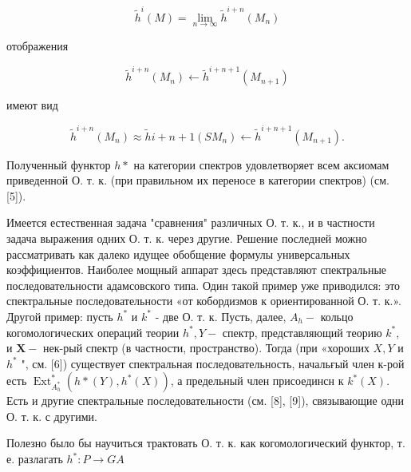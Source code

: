 \documentclass[10pt]{article}
\begin{document}
\[

\tilde{h}^{i}(M)=\lim _{n \rightarrow \infty} \tilde{h}^{i+n}\left(M_{n}\right)

\]



отображения



\[

\tilde{h}^{i+n}\left(M_{n}\right) \leftarrow \tilde{h}^{i+n+1}\left(M_{n+1}\right)

\]



имеют вид



\[

\tilde{h}^{i+n}\left(M_{n}\right) \approx \tilde{h} i+n+1\left(S M_{n}\right) \leftarrow \tilde{h}^{i+n+1}\left(M_{n+1}\right) .

\]



Полученный функтор $h *$ на категории спектров удовлетворяет всем аксиомам приведенной О. т. к. (при правильном их переносе в категории спектров) (см. [5]).



Имеется естественная задача "сравнения" различных О. т. к., и в частности задача выражения одних О. т. к. через другие. Решение последней можно рассматривать как далеко идущее обобщение формулы универсальных коэффициентов. Наиболее мощный аппарат здесь представляют спектральные последовательности адамсовского типа. Один такой пример уже приводился: это спектральные последовательности «от кобордизмов к ориентированной О. т. к.». Другой пример: пусть $h^{*}$ и $k^{*}$ - две О. т. к. Пусть, далее, $A_{h}-$ кольцо когомологических операций теории $h^{*}, Y-$ спектр, представляющий теорию $k^{*}$, и $\boldsymbol{X}-$ нек-рый спектр (в частности, пространство). Тогда (при «хороших $X, Y$ и $h^{*}$ ", см. [6]) существует спектральная последовательность, начальғый член к-рой есть $\operatorname{Ext}_{A_{h}^{*}}^{*}\left(h *(Y), h^{*}(X)\right)$, а предельный член присоединсн к $k^{*}(X)$. Есть и другие спектральные последовательности (см. [8], [9]), связывающие одни О. т. к. с другими.



Полезно было бы научиться трактовать О. т. к. как когомологический функтор, т. е. разлагать $h^{*}: P \rightarrow G A$
\end{document}

